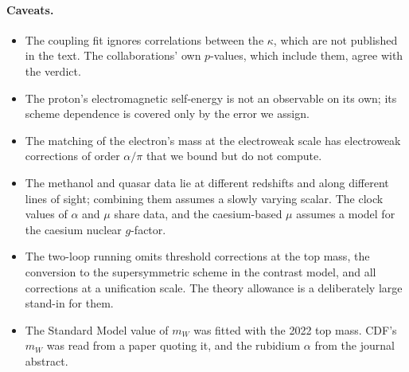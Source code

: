 \paragraph{Caveats.}
\begin{itemize}[nosep]
\item The coupling fit ignores correlations between the $\kappa$, which are not published in the text. The collaborations' own $p$-values, which
include them, agree with the verdict.
\item The proton's electromagnetic self-energy is not an observable on its own; its scheme dependence is covered only by the error we assign.
\item The matching of the electron's mass at the electroweak scale has electroweak corrections of order $\alpha/\pi$ that we bound but do not
compute.
\item The methanol and quasar data lie at different redshifts and along different lines of sight; combining them assumes a slowly varying
scalar. The clock values of $\alpha$ and $\mu$ share data, and the caesium-based $\mu$ assumes a model for the caesium nuclear $g$-factor.
\item The two-loop running omits threshold corrections at the top mass, the conversion to the supersymmetric scheme in the contrast model, and all
corrections at a unification scale. The theory allowance is a deliberately large stand-in for them.
\item The Standard Model value of $m_W$ was fitted with the 2022 top mass. CDF's $m_W$ was read from a paper quoting it, and the rubidium $\alpha$
from the journal abstract.
\end{itemize}

